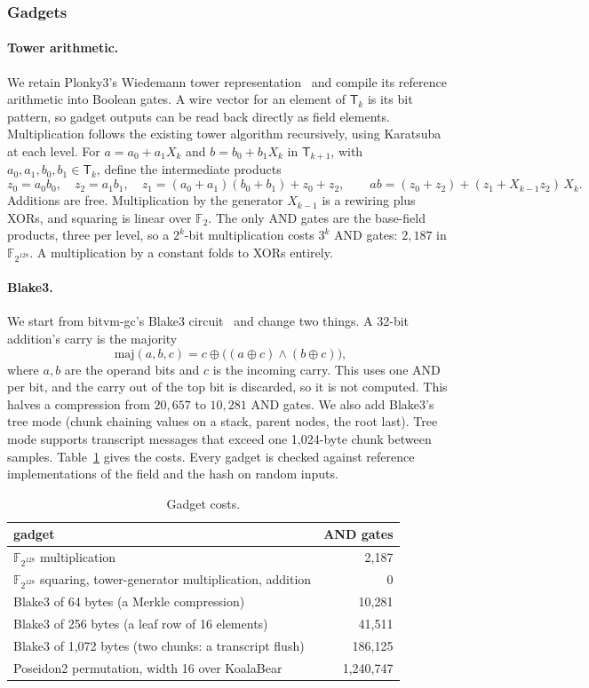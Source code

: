 \documentclass[11pt]{article}
\newcommand{\F}{\mathbb{F}_{2^{128}}}
\newcommand{\T}{\mathsf{T}}
\newcommand{\AND}{\textsf{AND}}
\newcommand{\XOR}{\textsf{XOR}}
\begin{document}
\subsubsection{Gadgets}\label{sec:gadgets}

\paragraph{Tower arithmetic.} We retain Plonky3's Wiedemann tower
representation~\cite{plonky3,wiedemann88} and compile its reference arithmetic into Boolean gates. A wire vector for an element of $\T_k$ is its
bit pattern, so gadget outputs can be read back directly as field elements.
Multiplication follows the existing tower algorithm recursively, using
Karatsuba at each level. For
$a=a_0+a_1X_k$ and $b=b_0+b_1X_k$ in $\T_{k+1}$, with
$a_0,a_1,b_0,b_1\in\T_k$, define the intermediate products
\[
  z_0=a_0b_0,\quad z_2=a_1b_1,\quad z_1=(a_0+a_1)(b_0+b_1)+z_0+z_2,\qquad
  ab=(z_0+z_2)+(z_1+X_{k-1}z_2)\,X_k .
\]
Additions are free. Multiplication by the generator $X_{k-1}$ is a rewiring plus
\XOR{}s, and squaring is linear over $\mathbb{F}_2$. The only \AND{} gates are
the base-field products, three per level, so a $2^k$-bit multiplication costs
$3^k$ \AND{} gates: $2{,}187$ in $\F$. A multiplication by a constant folds to
\XOR{}s entirely.

\paragraph{Blake3.} We start from bitvm-gc's Blake3 circuit~\cite{bitvmgc} and change two
things. A 32-bit addition's carry is the majority
\[
  \mathrm{maj}(a,b,c)=c\oplus\big((a\oplus c)\wedge(b\oplus c)\big),
\]
where $a,b$ are the operand bits and $c$ is the incoming carry. This uses
one \AND{} per bit, and the carry out of the top bit is discarded, so it is not
computed. This halves a compression from $20{,}657$ to $10{,}281$ \AND{} gates.
We also add Blake3's tree mode (chunk chaining values on a stack, parent nodes,
the root last). Tree mode supports transcript messages that exceed one 1{,}024-byte
chunk between samples. Table~\ref{tab:gadgets} gives the costs. Every gadget is checked
against reference implementations of the field and the hash on random inputs.

\begin{table}[t]\centering\small
\begin{tabular}{lr}\toprule
gadget & \AND{} gates\\\midrule
$\F$ multiplication & 2{,}187\\
$\F$ squaring, tower-generator multiplication, addition & 0\\
Blake3 of 64 bytes (a Merkle compression) & 10{,}281\\
Blake3 of 256 bytes (a leaf row of 16 elements) & 41{,}511\\
Blake3 of 1{,}072 bytes (two chunks: a transcript flush) & 186{,}125\\
Poseidon2 permutation, width 16 over KoalaBear & 1{,}240{,}747\\\bottomrule
\end{tabular}
\caption{Gadget costs.}
\label{tab:gadgets}
\end{table}
\end{document}
